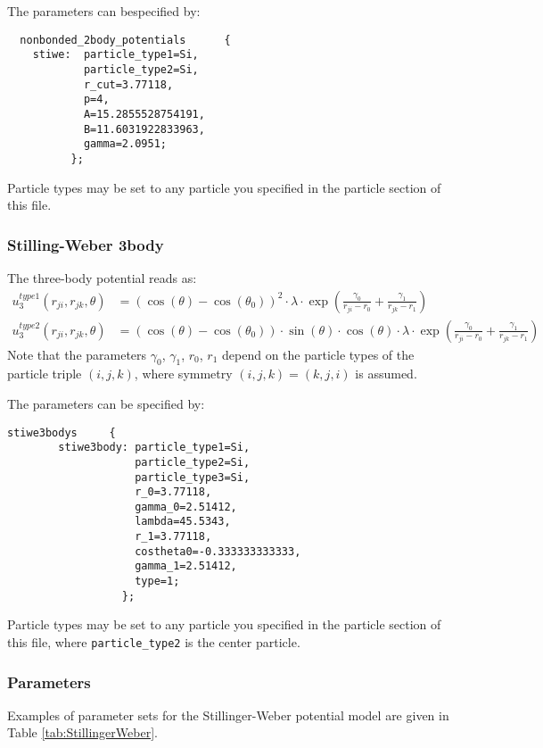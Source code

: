 The parameters can bespecified by:
\begin{lstlisting}
  nonbonded_2body_potentials      {
    stiwe:  particle_type1=Si,      
            particle_type2=Si,      
            r_cut=3.77118,  
            p=4,    
            A=15.2855528754191,     
            B=11.6031922833963,     
            gamma=2.0951;
          };
\end{lstlisting}
Particle types may be set to any particle you specified in the particle section of this file.

\subsubsection{Stilling-Weber 3body}
The three-body potential reads as:
\begin{align*}
u_3^{type1}(r_{ji}, r_{jk}, \theta)& = \left(\cos(\theta)-\cos(\theta_0)\right)^2\cdot\lambda\cdot\exp\left(\frac{\gamma_0}{r_{ji}-r_0}+\frac{\gamma_1}{r_{jk}-r_1}\right)\\
u_3^{type2}(r_{ji}, r_{jk}, \theta)& = \left(\cos(\theta)-\cos(\theta_0)\right)\cdot\sin(\theta)\cdot\cos(\theta)\cdot\lambda\cdot\exp\left(\frac{\gamma_0}{r_{ji}-r_0}+\frac{\gamma_1}{r_{jk}-r_1}\right)
\end{align*}
Note that the parameters $\gamma_0$, $\gamma_1$, $r_0$, $r_1$ depend
on the particle types of the particle triple $(i,j,k)$, where symmetry
$(i,j,k) = (k,j,i)$ is assumed.

The parameters can be specified by:
\begin{lstlisting}
stiwe3bodys     {
        stiwe3body: particle_type1=Si,      
                    particle_type2=Si,      
                    particle_type3=Si,      
                    r_0=3.77118,    
                    gamma_0=2.51412,        
                    lambda=45.5343, 
                    r_1=3.77118,    
                    costheta0=-0.333333333333,      
                    gamma_1=2.51412,        
                    type=1;
                  };
\end{lstlisting}
Particle types may be set to any particle you specified in the
particle section of this file, where \verb+particle_type2+ is the
center particle.

\subsubsection{Parameters}
Examples of parameter sets for the Stillinger-Weber potential model are given in Table \ref{tab:StillingerWeber}.

